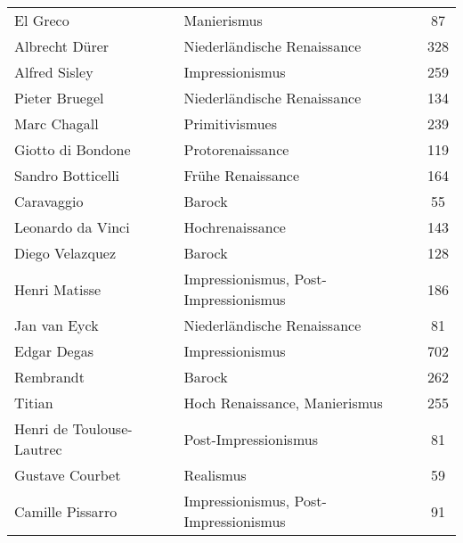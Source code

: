 \begin{table}
\begin{tabular}{l l c}
        El Greco    &            Manierismus   & 87       \\
        Albrecht Dürer  &      Niederländische Renaissance    & 328        \\
        Alfred Sisley   &       Impressionismus   & 259       \\
        Pieter Bruegel  &      Niederländische Renaissance    & 134        \\
        Marc Chagall    &        Primitivismues & 239      \\
        Giotto di Bondone   &  Protorenaissance   & 119       \\
        Sandro Botticelli   &   Frühe Renaissance   & 164       \\
        Caravaggio  &          Barock & 55     \\
        Leonardo da Vinci   &   Hochrenaissance   & 143       \\
        Diego Velazquez &     Barock & 128     \\
        Henri Matisse   &       Impressionismus, Post-Impressionismus  & 186        \\
        Jan van Eyck    &        Niederländische Renaissance    & 81       \\
        Edgar Degas &         Impressionismus   & 702     \\
        Rembrandt   &           Barock & 262       \\
        Titian  &              Hoch Renaissance, Manierismus    & 255     \\
        Henri de Toulouse-Lautrec &      Post-Impressionismus    & 81     \\
        Gustave Courbet    &   Realismus & 59     \\
        Camille Pissarro      &   Impressionismus, Post-Impressionismus  & 91       \\
    \bottomrule
    \end{tabular}
\end{table}

